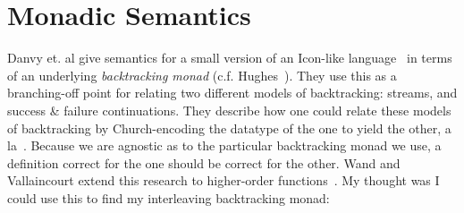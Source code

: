 \documentclass[11pt,twoside]{article}
\numberwithin{equation}{subsection} %
\begin{document}


                    
   


\section{Monadic Semantics}

Danvy et. al give semantics for a small version of an Icon-like
language~\cite{danvy2002unifying} in terms of an underlying
\emph{backtracking monad} (c.f. Hughes~\cite{Hughes1995design}). They
use this as a branching-off point for relating two different models of
backtracking: streams, and success \& failure continuations. They
describe how one could relate these models of backtracking by
Church-encoding the datatype of the one to yield the other, a
la~\cite{hughes1986novel}. Because we are agnostic as to the
particular backtracking monad we use, a definition correct for the one
should be correct for the other. Wand and Vallaincourt extend this
research to higher-order functions~\cite{wand2004relating}. My thought
was I could use this to find my interleaving backtracking monad:
\end{document}
